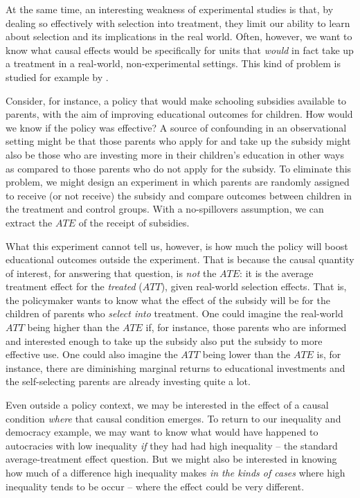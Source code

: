 \documentclass[
  12pt,
]{book}
\begin{document}
At the same time, an interesting weakness of experimental studies is that, by dealing so effectively with selection into treatment, they limit our ability to learn about selection and its implications in the real world. Often, however, we want to know what causal effects would be specifically for units that \emph{would} in fact take up a treatment in a real-world, non-experimental settings. This kind of problem is studied for example by \citet{knox2019design}.

Consider, for instance, a policy that would make schooling subsidies available to parents, with the aim of improving educational outcomes for children. How would we know if the policy was effective? A source of confounding in an observational setting might be that those parents who apply for and take up the subsidy might also be those who are investing more in their children's education in other ways as compared to those parents who do not apply for the subsidy. To eliminate this problem, we might design an experiment in which parents are randomly assigned to receive (or not receive) the subsidy and compare outcomes between children in the treatment and control groups. With a no-spillovers assumption, we can extract the \(ATE\) of the receipt of subsidies.

What this experiment cannot tell us, however, is how much the policy will boost educational outcomes outside the experiment. That is because the causal quantity of interest, for answering that question, is \emph{not} the \(ATE\): it is the average treatment effect for the \emph{treated} (\(ATT\)), given real-world selection effects. That is, the policymaker wants to know what the effect of the subsidy will be for the children of parents who \emph{select into} treatment. One could imagine the real-world \(ATT\) being higher than the \(ATE\) if, for instance, those parents who are informed and interested enough to take up the subsidy also put the subsidy to more effective use. One could also imagine the \(ATT\) being lower than the \(ATE\) is, for instance, there are diminishing marginal returns to educational investments and the self-selecting parents are already investing quite a lot.

Even outside a policy context, we may be interested in the effect of a causal condition \emph{where} that causal condition emerges. To return to our inequality and democracy example, we may want to know what would have happened to autocracies with low inequality \emph{if} they had had high inequality -- the standard average-treatment effect question. But we might also be interested in knowing how much of a difference high inequality makes \emph{in the kinds of cases} where high inequality tends to be occur -- where the effect could be very different.
\end{document}
